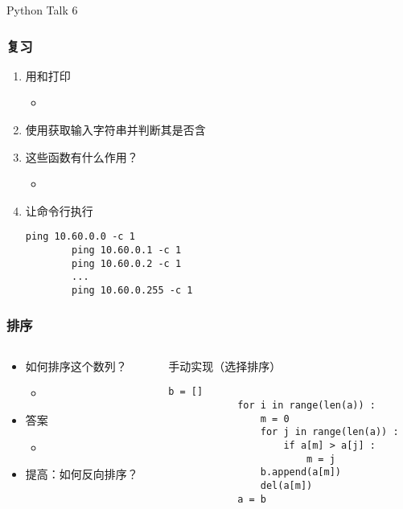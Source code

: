 



\PreFirstFrame
\begin{frame} [fragile]
	\centerline{\fontsize{42}{42}\selectfont Python Talk 6}
\end{frame}
\PostFirstFrame

\begin{frame} [fragile]
	\frametitle{复习}
	\linespread{1.25}
	\begin{enumerate}
	\item 用和打印
		\begin{itemize}
		\item {}
		\end{itemize}
	\item 使用获取输入字符串并判断其是否含
	\item 这些函数有什么作用？
		\begin{itemize}
		\item {}
		\end{itemize}
	\item 让命令行执行
		\begin{lstlisting}[basicstyle=\ttfamily]
		ping 10.60.0.0 -c 1
		ping 10.60.0.1 -c 1
		ping 10.60.0.2 -c 1
		...
		ping 10.60.0.255 -c 1
		\end{lstlisting}
	\end{enumerate}
\end{frame}

\begin{frame} [fragile]
	\frametitle{排序}
	\linespread{1.25}
	\begin{columns}[T]
		\begin{column}[T]{.5\textwidth}
			\begin{itemize}
			\item 如何排序这个数列？
				\begin{itemize}
				\item {}
				\end{itemize}
			\item 答案
				\begin{itemize}
				\item {}
				\end{itemize}
			\item 提高：如何反向排序？
			\end{itemize}
		\end{column}
		\begin{column}[T]{.5\textwidth}
			手动实现（选择排序）
			\footnotesize
			\begin{lstlisting}[style=pythonstyle, gobble=12]
			b = []
			for i in range(len(a)) :
				m = 0
				for j in range(len(a)) :
					if a[m] > a[j] :
						m = j
				b.append(a[m])
				del(a[m])
			a = b
			\end{lstlisting}
		\end{column}
	\end{columns}
\end{frame}

